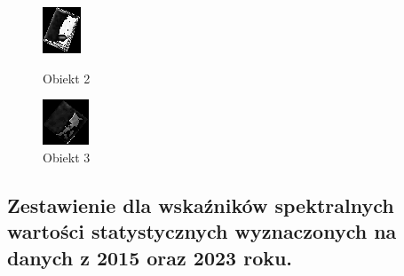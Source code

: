 \documentclass[a4paper,12pt]{article}  %
\begin{document}
\begin{figure}[H]
\begin{minipage}{0.24\textwidth}
        \includegraphics[width=\linewidth]{spektralne/ndvi_budynek0.png}
        \caption*{Obiekt 2}
    \end{minipage}
    \begin{minipage}{0.24\textwidth}
        \centering
        \includegraphics[width=\linewidth]{spektralne/ndvi_budynek7.png}
        \caption*{Obiekt 3}
    \end{minipage}
\end{figure}

\newpage
\subsection{Zestawienie dla wskaźników spektralnych wartości statystycznych wyznaczonych na danych z 2015 oraz 2023 roku.}
\end{document}

